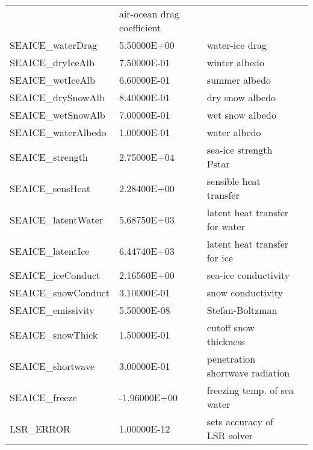 \begin{table}[h!]
{\begin{tabular}{|lllc|}
    &   air-ocean drag coefficient 
    &  %
    \\
   SEAICE\_waterDrag    &                   5.50000E+00
    &   water-ice drag 
    &  %
    \\
   SEAICE\_dryIceAlb    &                   7.50000E-01
    &   winter albedo 
    &  %
    \\
   SEAICE\_wetIceAlb    &                   6.60000E-01
    &   summer albedo 
    &  %
    \\
   SEAICE\_drySnowAlb   &                   8.40000E-01
    &   dry snow albedo 
    &  %
    \\
   SEAICE\_wetSnowAlb   &                   7.00000E-01
    &   wet snow albedo 
    &  %
    \\
   SEAICE\_waterAlbedo  &                   1.00000E-01
    &   water albedo 
    &  %
    \\
   SEAICE\_strength     &                   2.75000E+04
    &   sea-ice strength Pstar 
    &  %
    \\
   SEAICE\_sensHeat     &                   2.28400E+00
    &   sensible heat transfer 
    &  %
    \\
   SEAICE\_latentWater  &                   5.68750E+03
    &   latent heat transfer for water 
    &  %
    \\
   SEAICE\_latentIce    &                   6.44740E+03
    &   latent heat transfer for ice 
    &  %
    \\
   SEAICE\_iceConduct   &                   2.16560E+00
    &   sea-ice conductivity 
    &  %
    \\
   SEAICE\_snowConduct  &                   3.10000E-01
    &   snow conductivity 
    &  %
    \\
   SEAICE\_emissivity   &                   5.50000E-08
    &   Stefan-Boltzman 
    &  %
    \\
   SEAICE\_snowThick    &                   1.50000E-01
    &   cutoff snow thickness 
    &  %
    \\
   SEAICE\_shortwave    &                   3.00000E-01
    &   penetration shortwave radiation 
    &  %
    \\
   SEAICE\_freeze       &                  -1.96000E+00
    &   freezing temp. of sea water 
    &  %
    \\
   LSR\_ERROR           &                   1.00000E-12
    &   sets accuracy of LSR solver 

\end{tabular}}
\end{table}
